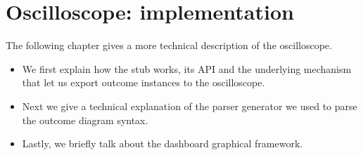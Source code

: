 \chapter{Oscilloscope: implementation}
    The following chapter gives a more technical description of the oscilloscope.
    \begin{itemize}
        \item We first explain how the stub works, its API and the underlying mechanism that let us export outcome instances to the oscilloscope.
        \item Next we give a technical explanation of the parser generator we used to parse the outcome diagram syntax.
        \item Lastly, we briefly talk about the dashboard graphical framework.
    \end{itemize}

    
    
    
    
